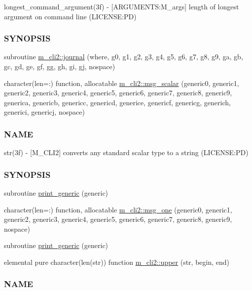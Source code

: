 \begin{DoxyCompactItemize}
\begin{DoxyCompactList}
longest\+\_\+command\+\_\+argument(3f) -\/ \mbox{[}A\+R\+G\+U\+M\+E\+N\+TS\+:M\+\_\+args\mbox{]} length of longest argument on command line (L\+I\+C\+E\+N\+SE\+:PD) \subsubsection*{S\+Y\+N\+O\+P\+S\+IS}\end{DoxyCompactList}\item 
subroutine \mbox{\hyperlink{namespacem__cli2_a4c12c311327951984c6e1611da23cdfd}{m\+\_\+cli2\+::journal}} (where, g0, g1, g2, g3, g4, g5, g6, g7, g8, g9, ga, gb, gc, gd, ge, gf, gg, gh, gi, gj, nospace)
\item 
character(len=\+:) function, allocatable \mbox{\hyperlink{namespacem__cli2_a737dc863a63dc101338840baad1cfd17}{m\+\_\+cli2\+::msg\+\_\+scalar}} (generic0, generic1, generic2, generic3, generic4, generic5, generic6, generic7, generic8, generic9, generica, genericb, genericc, genericd, generice, genericf, genericg, generich, generici, genericj, nospace)
\begin{DoxyCompactList}\small\item\em \subsubsection*{N\+A\+ME}

str(3f) -\/ \mbox{[}M\+\_\+\+C\+L\+I2\mbox{]} converts any standard scalar type to a string (L\+I\+C\+E\+N\+SE\+:PD) \subsubsection*{S\+Y\+N\+O\+P\+S\+IS}\end{DoxyCompactList}\item 
subroutine \mbox{\hyperlink{M__CLI2_8f90_aaa8ee15f943d8e1543ae35ab732c3cd2}{print\+\_\+generic}} (generic)
\item 
character(len=\+:) function, allocatable \mbox{\hyperlink{namespacem__cli2_a368e9aaa556f69228e7f0837bd558b82}{m\+\_\+cli2\+::msg\+\_\+one}} (generic0, generic1, generic2, generic3, generic4, generic5, generic6, generic7, generic8, generic9, nospace)
\item 
subroutine \mbox{\hyperlink{M__CLI2_8f90_a9d5e1620d474ac03a74eeb9b0f7d6ae1}{print\+\_\+generic}} (generic)
\item 
elemental pure character(len(str)) function \mbox{\hyperlink{namespacem__cli2_afa7a2419002024ff6d950c5d905ddd7a}{m\+\_\+cli2\+::upper}} (str, begin, end)
\begin{DoxyCompactList}\small\item\em \subsubsection*{N\+A\+ME}


\end{DoxyCompactList}
\end{DoxyCompactItemize}
